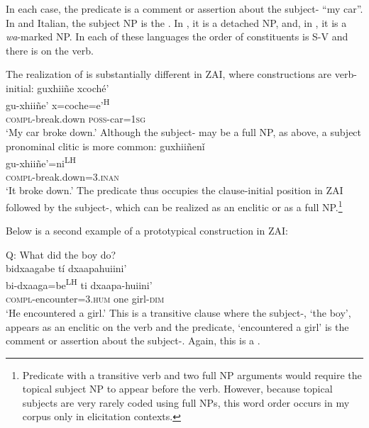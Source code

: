 
In each case, the predicate is a comment or assertion about the subject- ``my car''. In  and Italian, the subject NP is the . In , it is a detached NP, and, in , it is a \textit{wa}-marked NP. In each of these languages the order of constituents is S-V and there is  on the verb. 

The realization of  is substantially different in ZAI, where  constructions are verb-initial: 
\ea\label{predfoc1}
\glll guxhii\~{n}e xcoch\'{e}'  \\
gu-xhii\~{n}e' x=coche=e'\textsuperscript{H}  \\
\textsc{compl}-break.down \textsc{poss}-car=\textsc{1sg}  \\
\glt `My car broke down.'
\z
Although the subject- may be a full NP, as above, a subject pronominal clitic is more common:
\ea\label{predfoc2}
\glll guxhii\~{n}en\v{i} \\
gu-xhii\~{n}e'=ni\textsuperscript{LH}  \\
\textsc{compl}-break.down=\textsc{3.inan} \\
\glt `It broke down.'
\z
The predicate thus occupies the clause-initial position in ZAI followed by the subject-, which can be realized as an enclitic or as a full NP.\footnote{Predicate  with a transitive verb and two full NP arguments would require the topical subject NP to appear before the verb. However, because topical subjects are very rarely coded using full NPs, this word order occurs in my corpus only in elicitation contexts.}

Below is a second example of a prototypical  construction in ZAI:

\ea\label{predfocus}
{Q: What did the boy do?} \\
\glll bidxaagabe t\'{i} dxaapahuiini' \\
bi-dxaaga=be\textsuperscript{LH} ti dxaapa-huiini' \\
\textsc{compl}-encounter=\textsc{3.hum} one girl-\textsc{dim} \\
\glt `He encountered a girl.' 
\z
This is a transitive clause where the subject-, `the boy', appears as an enclitic on the verb and the predicate, `encountered a girl' is the comment or assertion about the subject-. Again, this is a .

